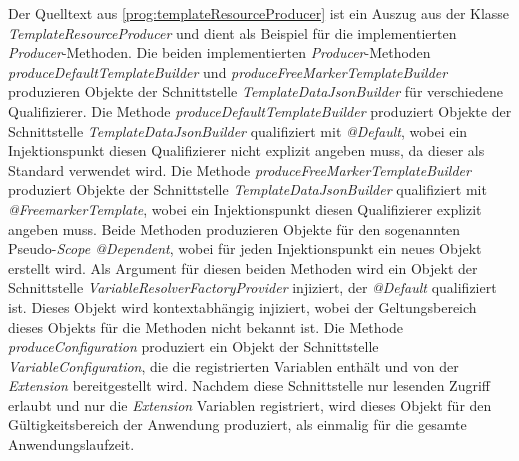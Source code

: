 Der Quelltext aus \ref{prog:templateResourceProducer} ist ein Auszug aus der Klasse \emph{TemplateResourceProducer} und dient als Beispiel für die implementierten \emph{Producer}-Methoden. Die beiden implementierten \emph{Producer}-Methoden \emph{produceDefaultTemplateBuilder} und \emph{produceFreeMarkerTemplateBuilder} produzieren Objekte der Schnittstelle \emph{TemplateDataJsonBuilder} für verschiedene Qualifizierer. Die Methode \emph{produceDefaultTemplateBuilder} produziert Objekte der Schnittstelle \emph{TemplateDataJsonBuilder} qualifiziert mit \emph{@Default}, wobei ein Injektionspunkt diesen Qualifizierer nicht explizit angeben muss, da dieser als Standard verwendet wird. Die Methode \emph{produceFreeMarkerTemplateBuilder} produziert Objekte der Schnittstelle \emph{TemplateDataJsonBuilder} qualifiziert mit \emph{@FreemarkerTemplate}, wobei ein Injektionspunkt diesen Qualifizierer explizit angeben muss.  Beide Methoden produzieren Objekte für den sogenannten Pseudo-\emph{Scope @Dependent}, wobei für jeden Injektionspunkt ein neues Objekt erstellt wird.
Als Argument für diesen beiden Methoden wird ein Objekt der Schnittstelle \emph{VariableResolverFactoryProvider} injiziert, der \emph{@Default} qualifiziert ist. Dieses Objekt wird kontextabhängig injiziert, wobei der Geltungsbereich dieses Objekts für die Methoden nicht bekannt ist. 
\newline
\newline
Die Methode \emph{produceConfiguration} produziert ein Objekt der Schnittstelle  \emph{VariableConfiguration}, die die registrierten Variablen enthält und von der \emph{Extension} bereitgestellt wird. Nachdem diese Schnittstelle nur lesenden Zugriff erlaubt und nur die \emph{Extension} Variablen registriert, wird dieses Objekt für den Gültigkeitsbereich der Anwendung produziert, als einmalig für die gesamte Anwendungslaufzeit.


